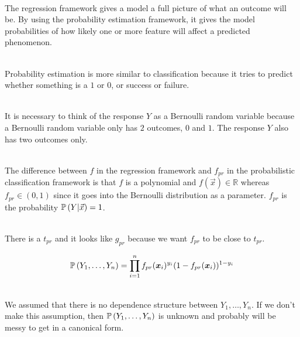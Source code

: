 \documentclass[12pt]{article}
\begin{document}


\begin{enumerate}

 \\
The regression framework gives a model a full picture of what an outcome will be. By using the probability estimation framework, it gives the model probabilities of how likely one or more feature will affect a predicted phenomenon. 

 \\
Probability estimation is more similar to classification because it tries to predict whether something is a $1$ or $0$, or success or failure.

 \\
It is necessary to think of the response $Y$ as a Bernoulli random variable because a Bernoulli random variable only has $2$ outcomes, $0$ and $1$. The response $Y$ also has two outcomes only. 


 \\
The difference between $f$ in the regression framework and $f_{pr}$ in the probabilistic classification framework is that $f$ is a polynomial and $f(\vec{x}) \in \mathbb{R}$ whereas $f_{pr} \in (0,1)$ since it goes into the Bernoulli distribution as a parameter. $f_{pr}$ is the probability $\mathbb{P}\left(Y |\vec{x}\right) = 1$. 


 \\
There is a $t_{pr}$ and it looks like $g_{pr}$ because we want $f_{pr}$ to be close to $t_{pr}$. 

\newpage
{} 
$$ \mathbb{P}\left(Y_1,\dots,Y_n\right) = \prod_{i=1}^n f_{pr}(\boldsymbol{x}_i)^{y_i}(1-f_{pr}(\boldsymbol{x}_i))^{1-y_i} $$ 

 \\
We assumed that there is no dependence structure between $Y_1,\dots,Y_n$. If we don't make this assumption, then $\mathbb{P}\left(Y_1,\dots,Y_n\right)$ is unknown and probably will be messy to get in a canonical form. 


\end{enumerate}
\end{document}
